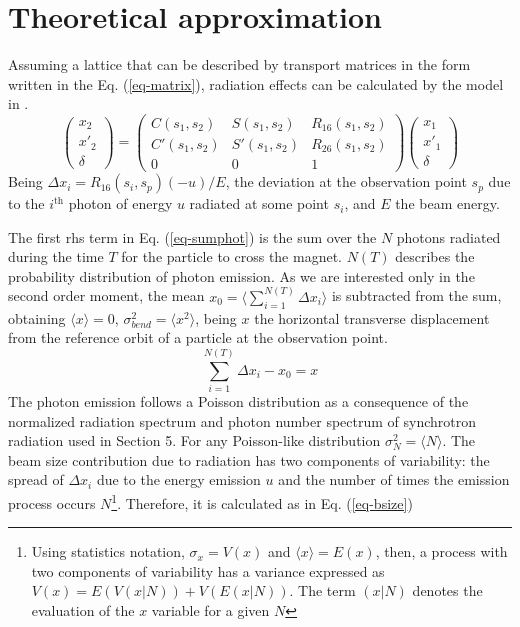 \section{Theoretical approximation}\label{radtheo}
Assuming a lattice that can be described by transport matrices in the form written in the Eq. (\ref{eq-matrix}), radiation effects can be calculated by the model in  \cite{Sands}.
\begin{equation}
\begin{pmatrix}
x_2\\
x'_2\\
\delta
\end{pmatrix}
=
\begin{pmatrix}
 C(s_1,s_2) & S(s_1,s_2)& R_{16}(s_1,s_2)\\
 C'(s_1,s_2) & S'(s_1,s_2) & R_{26}(s_1,s_2)\\
 0 & 0 &1
\end{pmatrix}
\begin{pmatrix}
x_1\\
x'_1\\
\delta
\end{pmatrix}
\label{eq-matrix}
\end{equation}
Being $\Delta x_i = R_{16}(s_i,s_p) (-u)/E$, the deviation at the observation point $s_p$ due to the $i^{\text{th}}$ photon of energy $u$ radiated at some point $s_i$, and $E$ the beam energy.\par The first rhs term in Eq. (\ref{eq-sumphot}) is the sum over the $N$ photons radiated during the time $T$ for the particle to cross the magnet. $N(T)$ describes the probability distribution of photon emission. As we are interested only in the second order moment, the mean  $x_0=\langle\sum_{i=1}^{N(T)}\Delta x_i\rangle$ is subtracted from the sum, obtaining $\langle x\rangle=0$, $ \sigma_{bend}^2=\langle x^2\rangle$, being $x$ the horizontal transverse displacement from the reference orbit of a particle at the observation point.
\begin{equation}
\sum_{i=1}^{N(T)}\Delta x_i - x_0 = x\label{eq-sumphot}
\end{equation}
The photon emission follows a Poisson distribution as a consequence of the normalized radiation spectrum and photon number spectrum of synchrotron radiation used in \cite{Sands2} Section 5. For any Poisson-like distribution $\sigma_N^2 = \langle N\rangle$. The beam size contribution due to radiation has two components of variability: the spread of $\Delta x_i$ due to the energy emission $u$ and the number of times the emission process occurs $N$\footnote{Using statistics notation, $\sigma_x=V(x)$ and $\langle x\rangle=E(x)$, then, a process with two components of variability has a variance expressed as $V(x)=E(V(x|N))+V(E(x|N))$. The term $(x|N)$ denotes the evaluation of the $x$ variable for a given $N$}. Therefore, it is calculated as in Eq. (\ref{eq-bsize})
